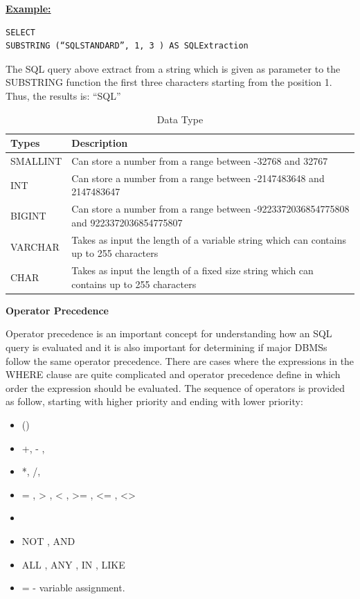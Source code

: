 \hfill\newpage
\noindent\textbf{\underline{Example:}}
\begin{mdframed}[backgroundcolor=lightgray!20] 
\begin{lstlisting}[style=SQL]
SELECT 
SUBSTRING (“SQLSTANDARD”, 1, 3 ) AS SQLExtraction 
\end{lstlisting}
\end{mdframed}

The SQL query above extract from a string which is given as parameter to the SUBSTRING function the first three characters starting from the position 1. Thus, the results is: “SQL”

\begin{table}[h]
\centering
\caption{Data Type}
\begin{tabular}{|p{2.5cm}|p{11.5cm}| }
\hline
\textbf{Types} & \textbf{Description}                                                                     \\ \hline
SMALLINT       & Can store a number from a range between -32768 and 32767                                 \\ \hline
INT            & Can store a number from a range between -2147483648 and 2147483647                       \\ \hline
BIGINT         & Can store a number from a range between -9223372036854775808 and 9223372036854775807     \\ \hline
VARCHAR        & Takes as input the length of a variable string which can contains up to 255 characters   \\ \hline
CHAR           & Takes as input the length of a fixed size string which can contains up to 255 characters \\ \hline
\end{tabular}
\end{table}


\textbf{Operator Precedence}

Operator precedence is an important concept for understanding how an SQL query is evaluated and it is also important for determining if major DBMSs follow the same operator precedence. There are cases where the expressions in the WHERE clause are quite complicated and operator precedence define in which order the expression should be evaluated. The sequence of operators is provided as follow, starting with higher priority and ending with lower priority: 

\begin{itemize}
\item  () 
\item  +, - , ~
\item  *, /, %
\item  = , > , < , >= , <= , <>
\item   
\item  NOT ,  AND
\item  ALL , ANY , IN , LIKE
\item  = - variable assignment. 
\end{itemize}

